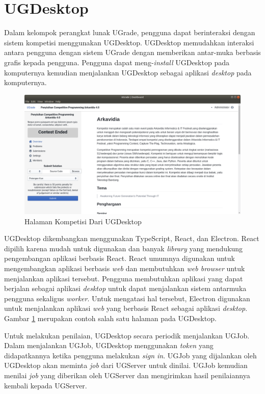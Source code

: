 \section{UGDesktop}

\par Dalam kelompok perangkat lunak UGrade, pengguna dapat berinteraksi dengan sistem kompetisi menggunakan UGDesktop. UGDesktop memudahkan interaksi antara pengguna dengan sistem UGrade dengan memberikan antar-muka berbasis grafis kepada pengguna. Pengguna dapat meng-\textit{install} UGDesktop pada komputernya kemudian menjalankan UGDesktop sebagai aplikasi \textit{desktop} pada komputernya.

\begin{figure}[ht!]
    \centering
    \includegraphics[width=\textwidth]{images/ugdesktop-example}
    \caption{Halaman Kompetisi Dari UGDesktop}
    \label{fig:ugdesktop-example}
\end{figure}

\par UGDesktop dikembangkan menggunakan TypeScript, React, dan Electron. React dipilih karena mudah untuk digunakan dan banyak \textit{library} yang mendukung pengembangan aplikasi berbasis React. React umumnya digunakan untuk mengembangkan aplikasi berbasis \textit{web} dan membutuhkan \textit{web browser} untuk menjalankan aplikasi tersebut. Pengguna membutuhkan aplikasi yang dapat berjalan sebagai aplikasi \textit{desktop} untuk dapat menjalankan sistem antarmuka pengguna sekaligus \textit{worker}. Untuk mengatasi hal tersebut, Electron digunakan untuk menjalankan aplikasi \textit{web} yang berbasis React sebagai aplikasi \textit{desktop}. Gambar \ref{fig:ugdesktop-example} merupakan contoh salah satu halaman pada UGDesktop.

\par Untuk melakukan penilaian, UGDesktop secara periodik menjalankan UGJob. Dalam menjalankan UGJob, UGDesktop menggunakan \textit{token} yang didapatkannya ketika pengguna melakukan \textit{sign in}. UGJob yang dijalankan oleh UGDesktop akan meminta \textit{job} dari UGServer untuk dinilai. UGJob kemudian menilai \textit{job} yang diberikan oleh UGServer dan mengirimkan hasil penilaiannya kembali kepada UGServer.

